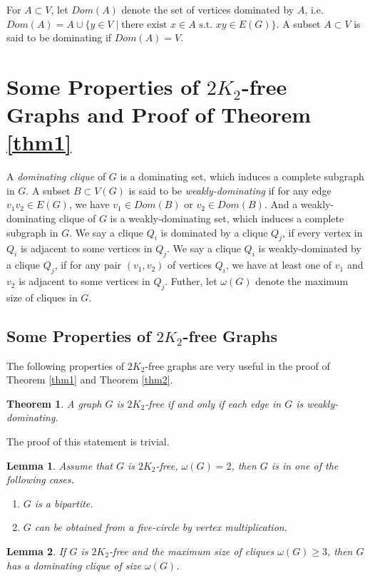 \documentclass{amsart}
\newtheorem{theorem}{Theorem}
\newtheorem{lemma}{Lemma}
\begin{document}
For $A\subset V$, let $Dom(A)$ denote the set of vertices dominated
by $A$, i.e. $Dom(A)=A\cup\{y\in V\mid\text{there exist } x\in A \text{ s.t. } xy\in
E(G)\}$. A subset $A\subset V$ is said to be dominating if $Dom(A)=V$. 

\section{Some Properties of $2K_2$-free Graphs and Proof of Theorem \ref{thm1}}
A {\em dominating clique} of $G$ is a dominating set, which induces a complete
subgraph in $G$. A subset $B\subset V(G)$ is said to be {\em weakly-dominating}
if for any edge $v_1v_2\in E(G)$, we have $v_1\in Dom(B)$ or $v_2\in Dom(B)$.
And a weakly-dominating clique of $G$ is a weakly-dominating set, which induces
a complete subgraph in $G$. We say a clique $Q_i$ is dominated by a clique
$Q_j$, if every vertex in $Q_i$ is adjacent to some vertices in $Q_j$. We say a
clique $Q_i$ is weakly-dominated by a clique $Q_j$, if for any pair $(v_1,v_2)$
of vertices $Q_i$, we have at least one of $v_1$ and $v_2$ is adjacent to some
vertices in $Q_j$.
Futher, let $\omega(G)$ denote the maximum size of cliques in $G$. 

\subsection{Some Properties of $2K_2$-free Graphs}
The following properties of $2K_2$-free graphs are very useful in the proof of Theorem \ref{thm1} and Theorem \ref{thm2}.

\begin{theorem}\label{trivial}
A graph $G$ is $2K_2$-free if and only if each edge in $G$ is weakly-dominating.
\end{theorem}
The proof of this statement is trivial.

\begin{lemma}\label{lm1}{\cite[Theorem 2.]{chung1990maximum}\cite[Lemma 2.]{broersma2014toughness}}
Assume that $G$ is $2K_2$-free, $\omega(G)=2$, then $G$ is in one of the following cases.
\begin{enumerate}
\item $G$ is a bipartite.
\item $G$ can be obtained from a five-circle by vertex multiplication.
\end{enumerate}
\end{lemma}



\begin{lemma}\label{lm2}{\cite[Theorem 3.]{chung1990maximum}}
If $G$ is $2K_2$-free and the maximum size of cliques $\omega(G)\ge3$, then $G$ has a dominating clique of size $\omega(G)$.
\end{lemma}
\end{document}
